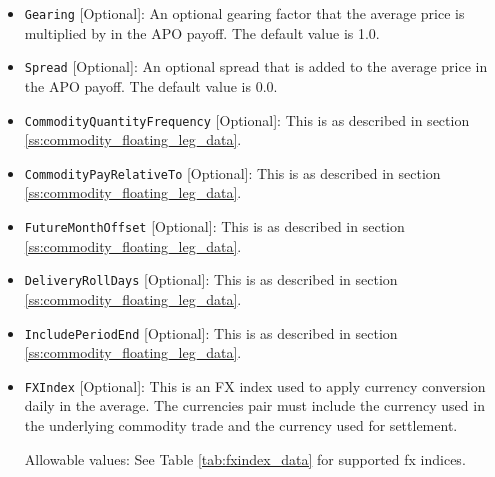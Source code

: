 \begin{itemize}
\item \lstinline!Gearing! [Optional]: An optional gearing factor that the average price is multiplied by in the APO payoff. The default value is 1.0.

\item \lstinline!Spread! [Optional]: An optional spread that is added to the average price in the APO payoff. The default value is 0.0.

\item \lstinline!CommodityQuantityFrequency! [Optional]: This is as described in section \ref{ss:commodity_floating_leg_data}.

\item \lstinline!CommodityPayRelativeTo! [Optional]: This is as described in section \ref{ss:commodity_floating_leg_data}.

\item \lstinline!FutureMonthOffset! [Optional]: This is as described in section \ref{ss:commodity_floating_leg_data}.

\item \lstinline!DeliveryRollDays! [Optional]: This is as described in section \ref{ss:commodity_floating_leg_data}.

\item \lstinline!IncludePeriodEnd! [Optional]: This is as described in section \ref{ss:commodity_floating_leg_data}.

\item \lstinline!FXIndex! [Optional]: This is an FX index used to apply currency conversion daily in the average. The currencies pair must include the currency used in the underlying commodity trade and the currency used for settlement.

Allowable values:  See Table \ref{tab:fxindex_data} for supported fx indices.

\end{itemize}

